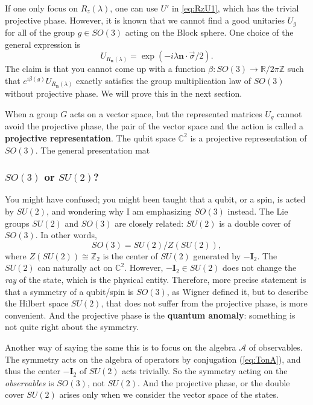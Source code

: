 \documentclass[
]{scrartcl}
\numberwithin{equation}{section}
\theoremstyle{definition}
\theoremstyle{definition}
\theoremstyle{definition}
\theoremstyle{definition}
\theoremstyle{remark}
\begin{document}
If one only focus on \(R_z(\lambda)\), one can use \(U'\) in \eqref{eq:RzU1}, which has the trivial projective phase.
However, it is known that we cannot find a good unitaries \(U_g\) for all of the group \(g\in SO(3)\) acting on the Block sphere. One choice of the general expression is
\begin{equation}
  \label{eq:generalRot}
  U_{R_{\mathbf{n}}(\lambda)}  = \exp(-i\lambda \mathbf{n}\cdot \vec{\sigma}/2).
\end{equation}
The claim is that you cannot come up with a function \(\beta: SO(3) \to \mathbb{R}/2\pi\mathbb{Z}\) such that \(e^{\mathrm{i}\beta(g)}U_{R_{\mathbf{n}}(\lambda)}\) exactly satisfies the group multiplication law of \(SO(3)\) without projective phase.
We will prove this in the next section.

When a group \(G\) acts on a vector space, but the represented matrices \(U_g\) cannot avoid the projective phase, the pair of the vector space and the action is called a \textbf{projective representation}.
The qubit space \(\mathbb{C}^2\) is a projective representation of \(SO(3)\).
The general presentation mat

\hypertarget{so3-or-su2}{%
\subsubsection{\texorpdfstring{\(SO(3)\) or \(SU(2)\)?}{SO(3) or SU(2)?}}\label{so3-or-su2}}

You might have confused; you might been taught that a qubit, or a spin, is acted by \(SU(2)\), and wondering why I am emphasizing \(SO(3)\) instead.
The Lie groups \(SU(2)\) and \(SO(3)\) are closely related: \(SU(2)\) is a double cover of \(SO(3)\).
In other words,
\begin{equation}
  \label{eq:SU2SO3}
  SO(3) = SU(2)/Z(SU(2)),
\end{equation}
where \(Z(SU(2))\cong \mathbb{Z}_2\) is the center of \(SU(2)\) generated by \(-\mathbf{I}_2\).
The \(SU(2)\) can naturally act on \(\mathbb{C}^2\).
However, \(-\mathbf{I}_2 \in SU(2)\) does not change the \emph{ray} of the state, which is the physical entity.
Therefore, more precise statement is that a symmetry of a qubit/spin is \(SO(3)\), as Wigner defined it,
but to describe the Hilbert space \(SU(2)\), that does not suffer from the projective phase, is more convenient.
And the projective phase is the \textbf{quantum anomaly}: something is not quite right about the symmetry.

Another way of saying the same this is to focus on the algebra \(\mathcal{A}\) of observables. The symmetry acts on the algebra of operators by conjugation (\eqref{eq:TonA}), and thus the center \(-\mathbf{I}_2\) of \(SU(2)\) acts trivially.
So the symmetry acting on the \emph{observables} is \(SO(3)\), not \(SU(2)\). And the projective phase, or the double cover \(SU(2)\) arises only when we consider the vector space of the states.
\end{document}

